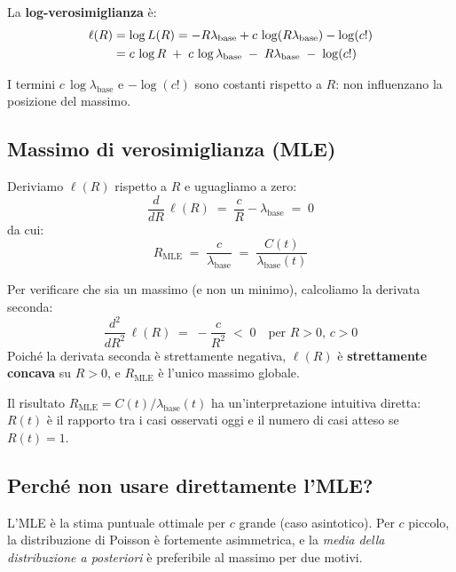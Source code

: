 \documentclass[12pt,a4paper]{article}
\newcommand{\lbase}{\lambda_{\mathrm{base}}}
\begin{document}
La \textbf{log-verosimiglianza} è:
\begin{align}
  \ell(R) &= \log L(R) = -R\lbase + c\,\log(R\lbase) - \log(c!) \notag \\
           &= c\,\log R \;+\; c\,\log\lbase \;-\; R\lbase \;-\; \log(c!)
  \label{eq:loglik}
\end{align}

I termini $c\,\log\lbase$ e $-\log(c!)$ sono costanti rispetto a $R$: non influenzano
la posizione del massimo.

\subsection{Massimo di verosimiglianza (MLE)}

Deriviamo $\ell(R)$ rispetto a $R$ e uguagliamo a zero:
\begin{equation}
  \frac{d}{dR}\,\ell(R) \;=\; \frac{c}{R} - \lbase \;=\; 0
\end{equation}
da cui:
\begin{equation}
  \boxed{R_{\mathrm{MLE}} \;=\; \frac{c}{\lbase} \;=\; \frac{C(t)}{\lbase(t)}}
  \label{eq:mle}
\end{equation}

Per verificare che sia un massimo (e non un minimo), calcoliamo la derivata seconda:
\begin{equation}
  \frac{d^2}{dR^2}\,\ell(R) \;=\; -\frac{c}{R^2} \;<\; 0 \quad \text{per } R > 0,\, c > 0
\end{equation}
Poiché la derivata seconda è strettamente negativa, $\ell(R)$ è \textbf{strettamente concava}
su $R > 0$, e $R_{\mathrm{MLE}}$ è l'unico massimo globale.

\begin{osservazione}
Il risultato $R_{\mathrm{MLE}} = C(t)/\lbase(t)$ ha un'interpretazione intuitiva diretta:
$R(t)$ è il rapporto tra i casi osservati oggi e il numero di casi atteso se $R(t) = 1$.
\end{osservazione}

\subsection{Perché non usare direttamente l'MLE?}

L'MLE è la stima puntuale ottimale per $c$ grande (caso asintotico). Per $c$ piccolo,
la distribuzione di Poisson è fortemente asimmetrica, e la \emph{media della distribuzione
a posteriori} è preferibile al massimo per due motivi.
\end{document}
